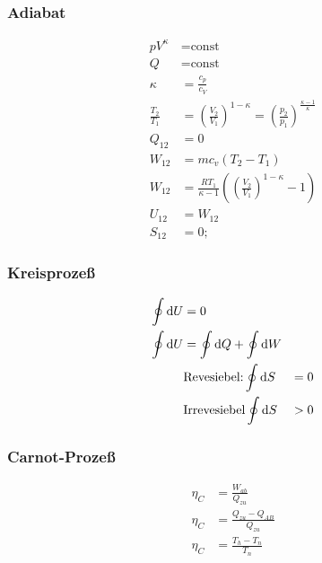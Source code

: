 \begin{multicols}{2}
\subsubsection*{Adiabat}
\begin{align*}
pV^\kappa&=\text{const}\\
Q&=\text{const}\\
\kappa&=\frac{c_p}{c_V}\\
\frac{T_2}{T_1}&=\left(\frac{V_2}{V_1}\right)^{1-\kappa}=\left(\frac{p_2}{p_1}\right)^{\frac{\kappa-1}{\kappa}}\\
Q_{12}&=0\\
W_{12}&=mc_v\left(T_2-T_1\right)\\
W_{12}&=\frac{RT_1}{\kappa-1}\left(\left(\frac{V_2}{V_1}\right)^{1-\kappa}-1\right)\\
U_{12}&=W_{12}\\
S_{12}&=0;
\end{align*}
\end{multicols}

\begin{multicols}{2}
\subsubsection*{Kreisprozeß}
\begin{align*}
\oint \mathop{}\!\mathrm{d} U&=0\\
\oint \mathop{}\!\mathrm{d} U&= \oint \mathop{}\!\mathrm{d} Q +\oint \mathop{}\!\mathrm{d} W\\
&\text{Revesiebel:}
\oint \mathop{}\!\mathrm{d} S&=0\\
&\text{Irrevesiebel}
\oint \mathop{}\!\mathrm{d} S&>0\\
\end{align*}

\subsubsection*{Carnot-Prozeß}
\begin{align*}
\eta_C&=\frac{W_{ab}}{Q_{zu}}\\
\eta_C&=\frac{Q_{zu}-Q_{AB}}{Q_{zu}}\\
\eta_C&=\frac{T_h-T_n}{T_n}
\end{align*}
\vfill
\end{multicols}